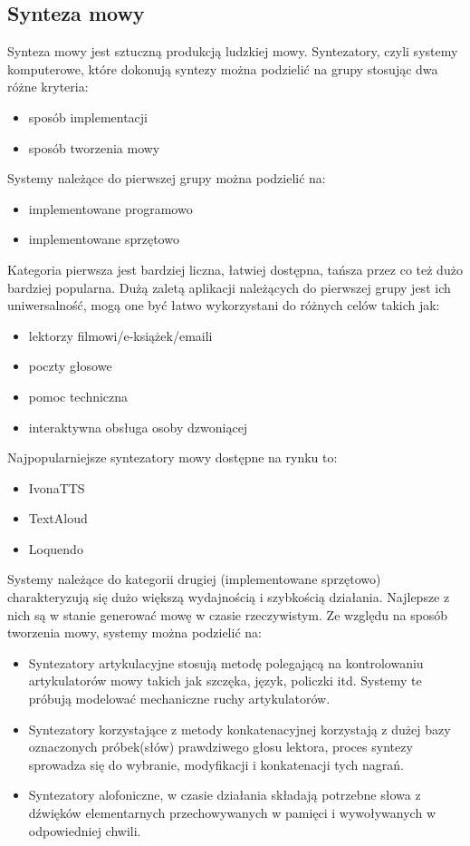 \subsection{Synteza mowy}   
Synteza mowy jest sztuczną produkcją ludzkiej mowy. Syntezatory, czyli systemy komputerowe, które dokonują syntezy można podzielić na grupy stosując dwa różne kryteria:
\begin{itemize}
	\item sposób implementacji
	\item sposób tworzenia mowy
\end{itemize}
Systemy należące do pierwszej grupy można podzielić na:
\begin{itemize}
	\item implementowane programowo
	\item implementowane sprzętowo
\end{itemize}
Kategoria pierwsza jest bardziej liczna, łatwiej dostępna, tańsza przez co też dużo bardziej popularna. Dużą zaletą aplikacji należących do pierwszej grupy jest ich uniwersalność,  mogą one być łatwo wykorzystani do różnych celów takich jak:
\begin{itemize}
	\item lektorzy filmowi/e-książek/emaili
	\item poczty głosowe
	\item pomoc techniczna
	\item interaktywna obsługa osoby  dzwoniącej
\end{itemize}
Najpopularniejsze syntezatory mowy dostępne na rynku to:
\begin{itemize}
	\item IvonaTTS
	\item TextAloud
	\item Loquendo
\end{itemize}
Systemy należące do kategorii drugiej (implementowane sprzętowo) charakteryzują się dużo większą wydajnością i szybkością działania. Najlepsze z nich są w stanie generować mowę w czasie rzeczywistym. 
Ze względu na sposób tworzenia mowy, systemy można podzielić na:
\begin{itemize}
	\item Syntezatory artykulacyjne stosują metodę polegającą na kontrolowaniu artykulatorów mowy takich jak szczęka, język, policzki itd. Systemy te próbują modelować mechaniczne ruchy artykulatorów.
	\item Syntezatory korzystające z metody konkatenacyjnej korzystają z dużej bazy oznaczonych próbek(słów) prawdziwego głosu lektora, proces syntezy sprowadza się do wybranie, modyfikacji i konkatenacji tych nagrań. 
	\item Syntezatory alofoniczne, w czasie działania składają potrzebne słowa z dźwięków elementarnych przechowywanych w pamięci i wywoływanych w odpowiedniej chwili. 
\end{itemize}
